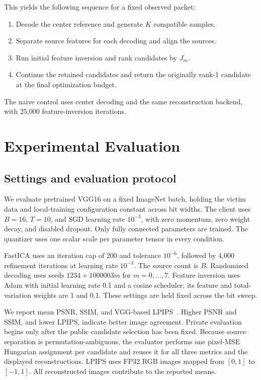 \documentclass[10pt,twocolumn]{article}
\begin{document}
This yields the following sequence for a fixed observed packet:
\begin{enumerate}
 \item Decode the center reference and generate $K$ compatible samples.
 \item Separate source features for each decoding and align the sources.
 \item Run initial feature inversion and rank candidates by $J_m$.
 \item Continue the retained candidates and return the originally
       rank-1 candidate at the final optimization budget.
\end{enumerate}
The naive control uses center decoding and the same reconstruction
backend, with 25,000 feature-inversion iterations.

\section{Experimental Evaluation}
\label{sec:experiments}
\subsection{Settings and evaluation protocol}
We evaluate pretrained VGG16 on a fixed ImageNet batch, holding the
victim data and local-training configuration constant across bit widths.
The client uses $B=16$, $T=10$, and SGD learning rate $10^{-3}$, with
zero momentum, zero weight decay, and disabled dropout. Only fully
connected parameters are trained. The quantizer uses one scalar scale
per parameter tensor in every condition.

FastICA uses an iteration cap of 200 and tolerance $10^{-6}$, followed
by 4,000 refinement iterations at learning rate $10^{-3}$. The source
count is $B$. Randomized decoding uses seeds $1234+1000003m$ for
$m=0,\ldots,7$. Feature inversion uses Adam with initial learning rate
0.1 and a cosine scheduler; its feature and total-variation weights are
1 and 0.1. These settings are held fixed across the bit sweep.

We report mean PSNR, SSIM, and VGG-based LPIPS~\cite{zhang2018lpips}.
Higher PSNR and SSIM, and lower LPIPS, indicate better image agreement.
Private evaluation begins only after the public candidate selection has
been fixed. Because source separation is permutation-ambiguous, the
evaluator performs one pixel-MSE Hungarian assignment per candidate and
reuses it for all three metrics and the displayed reconstructions.
LPIPS uses FP32 RGB images mapped from $[0,1]$ to $[-1,1]$.
All reconstructed images contribute to the reported means.
\end{document}
